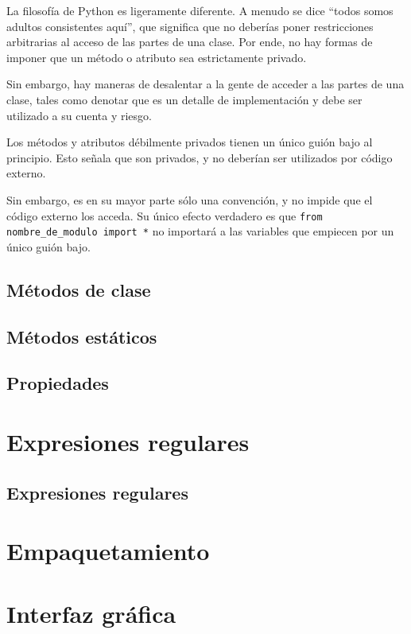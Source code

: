 \documentclass{report}
\newcommand{\doble}[1]{``#1''}
\begin{document}
La filosofía de Python es ligeramente diferente. A menudo se dice \doble{todos somos adultos consistentes aquí}, que significa que no deberías poner restricciones arbitrarias al acceso de las partes de una clase. Por ende, no hay formas de imponer que un método o atributo sea estrictamente privado.\smallskip

Sin embargo, hay maneras de desalentar a la gente de acceder a las partes de una clase, tales como denotar que es un detalle de implementación y debe ser utilizado a su cuenta y riesgo.\smallskip

Los métodos y atributos débilmente privados tienen un único guión bajo al principio. Esto señala que son privados, y no deberían ser utilizados por código externo.\smallskip

Sin embargo, es en su mayor parte sólo una convención, y no impide que el código externo los acceda. Su único efecto verdadero es que \texttt{from nombre\_de\_modulo import *} no importará a las variables que empiecen por un único guión bajo.

\section{Métodos de clase}

\section{Métodos estáticos}

\section{Propiedades}

\clearpage\chapter{Expresiones regulares}

\section{Expresiones regulares}

\clearpage\chapter{Empaquetamiento}

\clearpage\chapter{Interfaz gráfica}
\end{document}
